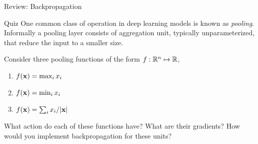 \documentclass{beamer}
\begin{document}
\begin{frame}{Review: Backpropagation}
  \begin{center}

  \end{center}
\end{frame}


\begin{frame}{Quiz}
  One common class of operation in deep learning models is known as
  \textit{pooling}. Informally a pooling layer consists of aggregation
  unit, typically unparameterized, that reduce the input to a smaller
  size.
  \air 

  Consider three pooling functions of the form $f: \mathbb{R}^n \mapsto \mathbb{R}$, 
  \begin{enumerate}
  \item $ f(\mathbf{x}) = \max_{i} x_i $
  \item $ f(\mathbf{x}) = \min_{i} x_i $
  \item $ f(\mathbf{x}) = \sum_i x_i / |\mathbf{x}| $
  \end{enumerate}
  \air

  What action do each of these functions have? What are their gradients? 
  How would you implement backpropagation for these units? 
\end{frame}
\end{document}

